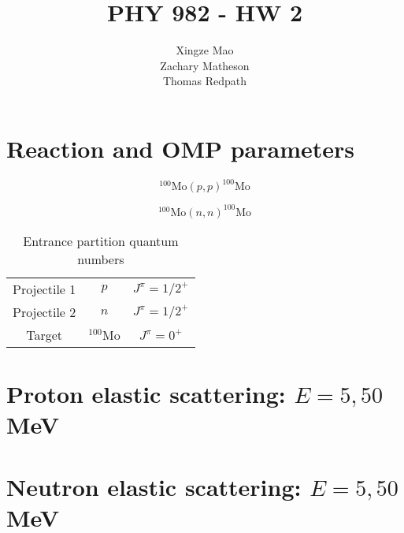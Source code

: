 \documentclass[]{scrartcl}
\title{PHY 982 - HW 2}
\author{Xingze Mao \\ Zachary Matheson \\ Thomas Redpath}
\date{}
\begin{document}
\maketitle

\section*{Reaction and OMP parameters}

\begin{equation}
	^{100} \mathrm{Mo} (p,p) ^{100} \mathrm{Mo}
	\label{eq:therxn}
\end{equation}

\begin{equation}
	^{100} \mathrm{Mo} (n,n) ^{100} \mathrm{Mo}
	\label{eq:therxn}
\end{equation}


\begin{table}
\centering
	\begin{tabular}{ | c | c  c | }
\hline
	Projectile 1 & $p$ & $ J ^{\pi} = 1/2 ^+ $ \\
	Projectile 2 & $n$ & $ J ^{\pi} = 1/2 ^+ $ \\
\hline
	Target & $ ^{100} \mathrm{Mo} $ & $ J ^{\pi} = 0 ^+ $ \\
\hline
	\end{tabular}
	\caption{Entrance partition quantum numbers}
	\label{tab:entrance}
\end{table}

\section*{Proton elastic scattering: $E=5,50$ MeV}

\section*{Neutron elastic scattering: $E=5,50$ MeV}





\clearpage


%
%
\end{document}

